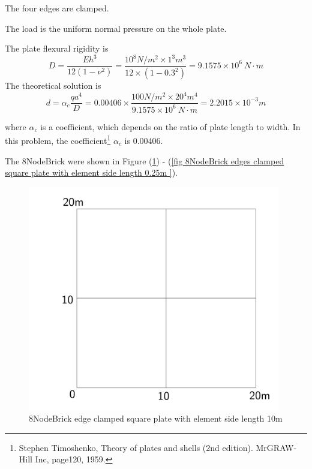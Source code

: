 \documentclass[fleqn,11pt]{article}
\begin{document}
The four edges are clamped. 

The load is the uniform normal pressure on the whole plate. 


The plate flexural rigidity is 
\begin{equation}
  D=\frac{Eh^3}{12(1-\nu^2)}=\frac{10^8 N/m^2 \times 1^3 m^3 }{12 \times (1-0.3^2) }= 9.1575 \times 10^6 \ N\cdot m
\end{equation}
The theoretical solution is 
\begin{equation}
  d=\alpha_c \frac{q a^4}{D}=0.00406\times \frac{100 N/m^2 \times 20^4 m^4}{9.1575 \times 10^6 \ N\cdot m}=2.2015\times 10^{-3} m
\end{equation}

where $\alpha_c$ is a coefficient, which depends on the ratio of plate length to width. In this problem, the coefficient\footnote{Stephen Timoshenko, Theory of plates and shells (2nd edition). MrGRAW-Hill Inc, page120, 1959.} $\alpha_c$ is 0.00406.


The 8NodeBrick were shown in Figure (\ref{fig 8NodeBrick edges clamped square plate with element side length 10m }) - (\ref{fig 8NodeBrick edges clamped square plate with element side length 0.25m }). 


\begin{figure}[H]
  \centering
  \includegraphics[width=11cm]{../Figure-files/square_plate1.pdf}
  \caption{8NodeBrick edge clamped square plate with element side length 10m }
  \label{fig 8NodeBrick edges clamped square plate with element side length 10m }
\end{figure}

\newpage
\end{document}
